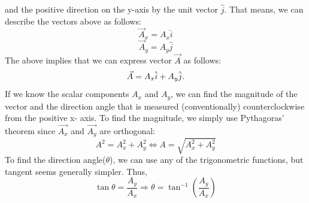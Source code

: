 \documentclass[9pt]{exam}
\begin{document}
and the positive direction on the y-axis by the unit vector  $\hat{j}$. That means, we can describe the vectors above as follows:
$$\vec{A}_{x} = A_{x} \hat{i}$$
$$\vec{A}_{y} = A_{y} \hat{j}$$
The above implies that we can express vector $\vec{A}$ as follows:
$$\vec{A} = A_{x} \hat{i} + A_{y} \hat{j} \ldotp \label{2.12}$$
If we know the scalar components $A_x$ and $A_y$, we can find the magnitude of the vector and the direction angle that is measured (conventionally) counterclockwise from the positive x- axis. To find the magnitude, we simply use Pythagoras' theorem since $\vec{A_x}$ and $\vec{A_y}$ are orthogonal:
$$A^{2} = A_{x}^{2} + A_{y}^{2} \Leftrightarrow A = \sqrt{A_{x}^{2} + A_{y}^{2}} $$
To find the direction angle($\theta$), we can use any of the trigonometric functions, but tangent seems generally simpler. Thus,
$$\tan \theta = \frac{A_{y}}{A_{x}} \Rightarrow \theta = \tan^{-1} \left(\dfrac{A_{y}}{A_{x}}\right)$$
\end{document}
